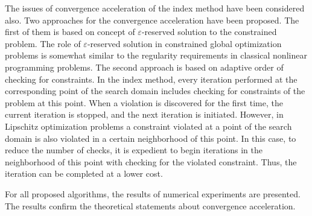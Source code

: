 \documentclass[graybox]{svmult}
\begin{document}
The issues of convergence acceleration of the index method have been considered also. Two approaches for the convergence acceleration have been proposed. The first of them is based on concept of $\varepsilon$-reserved solution to the constrained problem. The role of $\varepsilon$-reserved solution in constrained global optimization problems is somewhat similar to the regularity requirements in classical nonlinear programming problems. The second approach is based on adaptive order of checking for constraints. In the index method, every iteration performed at the corresponding point of the search domain includes checking for constraints of the problem at this point. When a violation is discovered for the first time, the current iteration is stopped, and the next iteration is initiated. However, in Lipschitz optimization problems a constraint violated at a point of the search domain is also violated in a certain neighborhood of this point. In this case, to reduce the number of checks, it is expedient to begin iterations in the neighborhood of this point with checking for the violated constraint. Thus, the iteration can be completed at a lower cost.

For all proposed algorithms, the results of numerical experiments are presented. The results confirm the theoretical statements about convergence acceleration.
\end{document}
